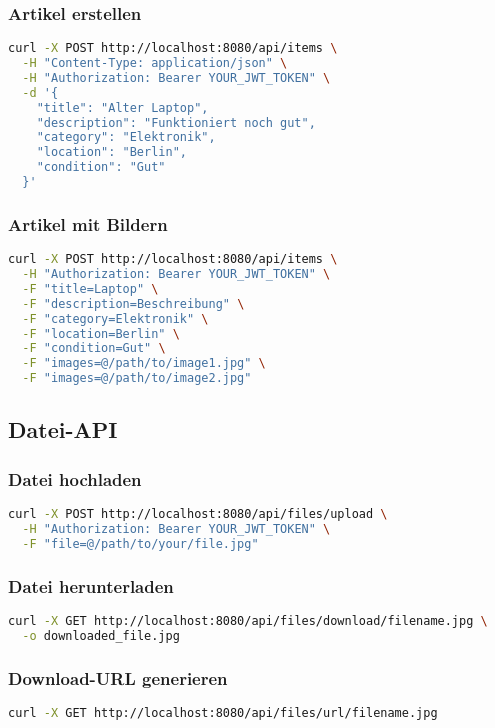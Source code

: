 \documentclass[a4paper,12pt]{article}
\begin{document}
\subsubsection{Artikel erstellen}
\begin{lstlisting}[language=bash]
curl -X POST http://localhost:8080/api/items \
  -H "Content-Type: application/json" \
  -H "Authorization: Bearer YOUR_JWT_TOKEN" \
  -d '{
    "title": "Alter Laptop",
    "description": "Funktioniert noch gut",
    "category": "Elektronik",
    "location": "Berlin",
    "condition": "Gut"
  }'
\end{lstlisting}

\subsubsection{Artikel mit Bildern}
\begin{lstlisting}[language=bash]
curl -X POST http://localhost:8080/api/items \
  -H "Authorization: Bearer YOUR_JWT_TOKEN" \
  -F "title=Laptop" \
  -F "description=Beschreibung" \
  -F "category=Elektronik" \
  -F "location=Berlin" \
  -F "condition=Gut" \
  -F "images=@/path/to/image1.jpg" \
  -F "images=@/path/to/image2.jpg"
\end{lstlisting}

\subsection{Datei-API}

\subsubsection{Datei hochladen}
\begin{lstlisting}[language=bash]
curl -X POST http://localhost:8080/api/files/upload \
  -H "Authorization: Bearer YOUR_JWT_TOKEN" \
  -F "file=@/path/to/your/file.jpg"
\end{lstlisting}

\subsubsection{Datei herunterladen}
\begin{lstlisting}[language=bash]
curl -X GET http://localhost:8080/api/files/download/filename.jpg \
  -o downloaded_file.jpg
\end{lstlisting}

\subsubsection{Download-URL generieren}
\begin{lstlisting}[language=bash]
curl -X GET http://localhost:8080/api/files/url/filename.jpg
\end{lstlisting}
\end{document}
